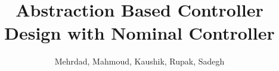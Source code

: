 \documentclass{llncs}
\title{Abstraction Based Controller Design with Nominal Controller}
\author{Mehrdad, Mahmoud, Kaushik, Rupak, Sadegh}
\begin{document}
\maketitle

\begin{abstract}
	
\end{abstract}



	 




\end{document}
